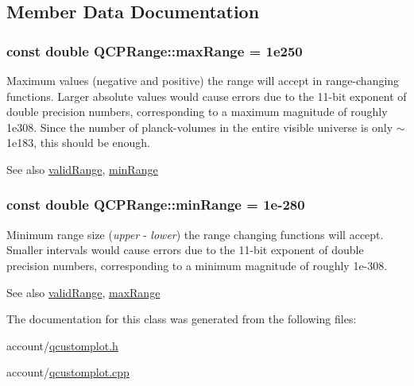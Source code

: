 \subsection{\-Member \-Data \-Documentation}
\hypertarget{classQCPRange_a5ca51e7a2dc5dc0d49527ab171fe1f4f}{
\subsubsection[{max\-Range}]{\setlength{\rightskip}{0pt plus 5cm}const double {\bf \-Q\-C\-P\-Range\-::max\-Range} = 1e250}}\label{classQCPRange_a5ca51e7a2dc5dc0d49527ab171fe1f4f}
\-Maximum values (negative and positive) the range will accept in range-\/changing functions. \-Larger absolute values would cause errors due to the 11-\/bit exponent of double precision numbers, corresponding to a maximum magnitude of roughly 1e308. \-Since the number of planck-\/volumes in the entire visible universe is only $\sim$1e183, this should be enough. \begin{DoxySeeAlso}{\-See also}
\hyperlink{classQCPRange_ab38bd4841c77c7bb86c9eea0f142dcc0}{valid\-Range}, \hyperlink{classQCPRange_ab46d3bc95030ee25efda41b89e2b616b}{min\-Range} 
\end{DoxySeeAlso}
\hypertarget{classQCPRange_ab46d3bc95030ee25efda41b89e2b616b}{
\subsubsection[{min\-Range}]{\setlength{\rightskip}{0pt plus 5cm}const double {\bf \-Q\-C\-P\-Range\-::min\-Range} = 1e-\/280}}\label{classQCPRange_ab46d3bc95030ee25efda41b89e2b616b}
\-Minimum range size ({\itshape upper\/} -\/ {\itshape lower\/}) the range changing functions will accept. \-Smaller intervals would cause errors due to the 11-\/bit exponent of double precision numbers, corresponding to a minimum magnitude of roughly 1e-\/308. \begin{DoxySeeAlso}{\-See also}
\hyperlink{classQCPRange_ab38bd4841c77c7bb86c9eea0f142dcc0}{valid\-Range}, \hyperlink{classQCPRange_a5ca51e7a2dc5dc0d49527ab171fe1f4f}{max\-Range} 
\end{DoxySeeAlso}


\-The documentation for this class was generated from the following files\-:\begin{DoxyCompactItemize}
\item 
account/\hyperlink{qcustomplot_8h}{qcustomplot.\-h}\item 
account/\hyperlink{qcustomplot_8cpp}{qcustomplot.\-cpp}\end{DoxyCompactItemize}
